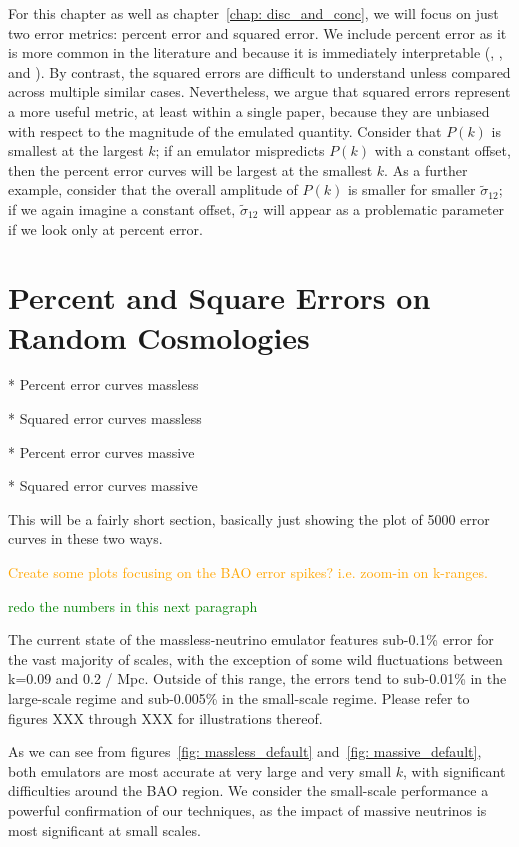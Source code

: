For this chapter as well as chapter~\ref{chap: disc_and_conc}, we will focus
on just two error metrics: percent error and squared error. We include percent
error as it is more common in the literature and because it is immediately
interpretable (\citealp{Mancini}, \citealp{Arico}, and
\citealp{Eggemeier}). By contrast, the squared errors are difficult to
understand unless compared across multiple similar cases.
Nevertheless, we argue
that squared errors represent a more useful metric, at least within a single
paper, because they are unbiased with respect to the magnitude of the emulated
quantity. Consider that $P(k)$ is smallest at the largest $k$; if an emulator
mispredicts $P(k)$ with a constant offset, then the percent error curves will
be largest at the smallest $k$. As a further example, consider that the
overall amplitude of $P(k)$ is smaller for smaller $\tilde{\sigma}_{12}$;
if we again imagine a constant offset, $\tilde{\sigma}_{12}$ will appear as a
problematic parameter if we look only at percent error.


\section{Percent and Square Errors on Random Cosmologies}

* Percent error curves massless

* Squared error curves massless

* Percent error curves massive

* Squared error curves massive

This will be a fairly short section, basically just showing the plot of 5000 
error curves in these two ways.

\textcolor{orange}{Create some plots focusing on the BAO error spikes? i.e.
zoom-in on k-ranges.}

\textcolor{green}{redo the numbers in this next paragraph}

The current state of the massless-neutrino emulator features sub-0.1\% error 
for the vast majority of scales, with the exception of some wild fluctuations  
between k=0.09 and 0.2 / Mpc. Outside of this range, the errors tend to 
sub-0.01\% in the large-scale regime and sub-0.005\% in the small-scale 
regime. Please refer to figures XXX through XXX for illustrations thereof.

As we can see from figures~\ref{fig: massless_default} 
and~\ref{fig: massive_default}, 
both emulators are most accurate at very large and
very small $k$, with significant difficulties around the BAO region. We
consider the small-scale performance a powerful confirmation of our
techniques, as the impact of massive neutrinos is most significant at small
scales.

